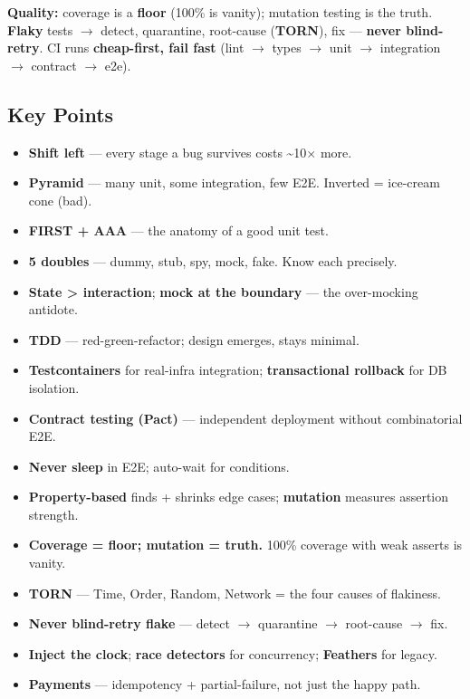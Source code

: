 \documentclass[11pt]{article}
\providecommand{\tightlist}{\setlength{\itemsep}{1pt}\setlength{\parskip}{0pt}}
\begin{document}
\textbf{Quality:} coverage is a \textbf{floor} (100\% is vanity); mutation testing is the truth. \textbf{Flaky} tests \(\rightarrow\) detect, quarantine, root-cause (\textbf{TORN}), fix --- \textbf{never blind-retry}. CI runs \textbf{cheap-first, fail fast} (lint \(\rightarrow\) types \(\rightarrow\) unit \(\rightarrow\) integration \(\rightarrow\) contract \(\rightarrow\) e2e).

\subsection{Key Points}\label{key-points}

\begin{itemize}
\tightlist
\item
  \textbf{Shift left} --- every stage a bug survives costs \textasciitilde10\(\times\) more.
\item
  \textbf{Pyramid} --- many unit, some integration, few E2E. Inverted = ice-cream cone (bad).
\item
  \textbf{FIRST + AAA} --- the anatomy of a good unit test.
\item
  \textbf{5 doubles} --- dummy, stub, spy, mock, fake. Know each precisely.
\item
  \textbf{State \textgreater{} interaction}; \textbf{mock at the boundary} --- the over-mocking antidote.
\item
  \textbf{TDD} --- red-green-refactor; design emerges, stays minimal.
\item
  \textbf{Testcontainers} for real-infra integration; \textbf{transactional rollback} for DB isolation.
\item
  \textbf{Contract testing (Pact)} --- independent deployment without combinatorial E2E.
\item
  \textbf{Never sleep} in E2E; auto-wait for conditions.
\item
  \textbf{Property-based} finds + shrinks edge cases; \textbf{mutation} measures assertion strength.
\item
  \textbf{Coverage = floor; mutation = truth.} 100\% coverage with weak asserts is vanity.
\item
  \textbf{TORN} --- Time, Order, Random, Network = the four causes of flakiness.
\item
  \textbf{Never blind-retry flake} --- detect \(\rightarrow\) quarantine \(\rightarrow\) root-cause \(\rightarrow\) fix.
\item
  \textbf{Inject the clock}; \textbf{race detectors} for concurrency; \textbf{Feathers} for legacy.
\item
  \textbf{Payments} --- idempotency + partial-failure, not just the happy path.
\end{itemize}
\end{document}
